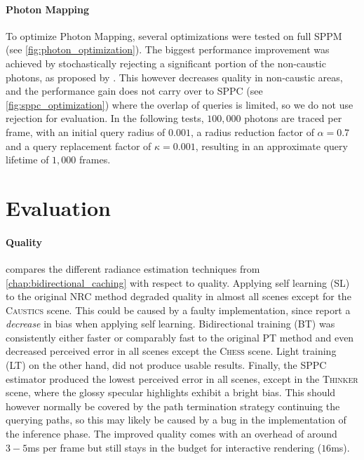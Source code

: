 \paragraph{Photon Mapping} To optimize Photon Mapping, several optimizations were tested on full SPPM (see \cref{fig:photon_optimization}).
The biggest performance improvement was achieved by stochastically rejecting a significant portion of the non-caustic photons, as proposed by \textcite{kern2023}.
This however decreases quality in non-caustic areas, and the performance gain does not carry over to SPPC (see \cref{fig:sppc_optimization}) where the overlap of queries is limited, so we do not use rejection for evaluation.
In the following tests, $100,000$ photons are traced per frame, with an initial query radius of $0.001$, a radius reduction factor of $\alpha=0.7$ and a query replacement factor of $\kappa=0.001$, resulting in an approximate query lifetime of $1,000$ frames.

\section{Evaluation}

\paragraph{Quality}  compares the different radiance estimation techniques from \cref{chap:bidirectional_caching} with respect to quality.
Applying self learning (SL) to the original NRC method degraded quality in almost all scenes except for the \textsc{Caustics} scene.
This could be caused by a faulty implementation, since \textcite{muller2021} report a \emph{decrease} in bias when applying self learning.
Bidirectional training (BT) was consistently either faster or comparably fast to the original PT method and even decreased perceived error in all scenes except the \textsc{Chess} scene.
Light training (LT) on the other hand, did not produce usable results.
Finally, the SPPC estimator produced the lowest perceived error in all scenes, except in the \textsc{Thinker} scene, where the glossy specular highlights exhibit a bright bias.
This should however normally be covered by the path termination strategy continuing the querying paths, so this may likely be caused by a bug in the implementation of the inference phase.
The improved quality comes with an overhead of around $3-5$ms per frame but still stays in the budget for interactive rendering ($16$ms).

